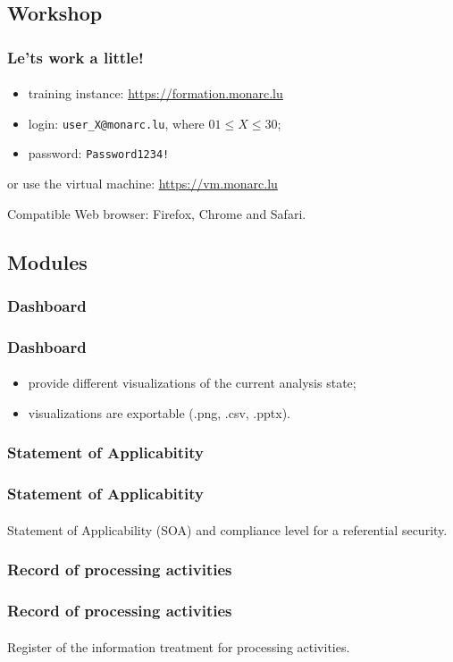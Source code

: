 \subsection{Workshop}
\begin{frame}
    \frametitle{Le'ts work a little!}
    \framesubtitle{}
    \begin{itemize}
      \item training instance: \url{https://formation.monarc.lu}
      \item login: \texttt{user\_X@monarc.lu}, where $01 \leq X \leq 30$;
      \item password: \texttt{Password1234!}
    \end{itemize}

    \bigskip
    
    or use the virtual machine: \url{https://vm.monarc.lu}
    
    \bigskip
    Compatible Web browser: Firefox, Chrome and Safari.
\end{frame}



\subsection{Modules}
\subsubsection{Dashboard}
\begin{frame}
    \frametitle{Dashboard}
    \framesubtitle{}
    \begin{itemize}
        \item provide different visualizations of the current analysis state;
        \item visualizations are exportable (.png, .csv, .pptx).
    \end{itemize}
\end{frame}

\subsubsection{Statement of Applicabitity}
\begin{frame}
    \frametitle{Statement of Applicabitity}
    \framesubtitle{}
    Statement of Applicability (SOA) and compliance level for a referential security.
\end{frame}

\subsubsection{Record of processing activities}
\begin{frame}
    \frametitle{Record of processing activities}
    \framesubtitle{}
    Register of the information treatment for processing activities.
\end{frame}



